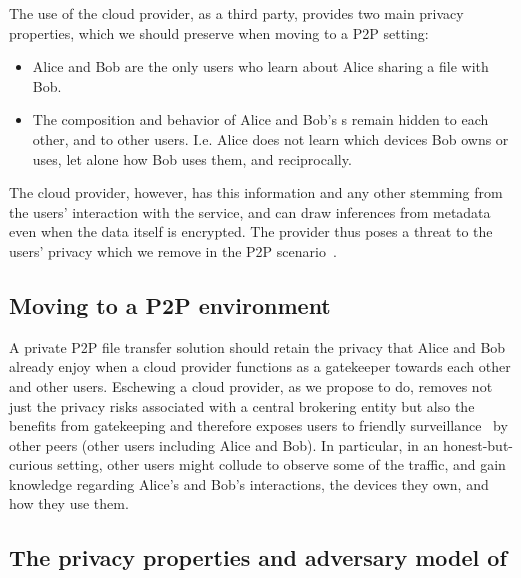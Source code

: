 The use of the cloud provider, as a third party,
provides two main privacy properties, which we should preserve when
moving to a P2P setting:
\begin{itemize}
\item Alice and Bob are the only users who learn 
about Alice sharing a file with Bob.
\item The composition and behavior of Alice and Bob's \squad{}s remain
  hidden to each other, and to other users. I.e. Alice does not learn
  which devices Bob owns or uses, let alone how Bob uses them, and
  reciprocally.
\end{itemize} 
The cloud provider, however, has this information and any other
stemming from the users' interaction with the service, and can draw
inferences from metadata even when the data itself is encrypted. The
provider thus poses a threat to the users' privacy which we remove in
the P2P scenario~\cite{DevilInMetadata}.


\subsection{Moving to a P2P environment}
A private P2P file transfer solution should retain the privacy that
Alice and Bob already enjoy when a cloud provider functions as a
gatekeeper towards each other and other users.  Eschewing a cloud
provider, as we propose to do, removes not just the privacy risks
associated with a central brokering entity but also the benefits from
gatekeeping and therefore exposes users to friendly
surveillance~\cite{FriendlySurveillance} by other peers (other \name
users including Alice and Bob). In particular, in an
honest-but-curious setting, other users might collude to observe some
of the traffic, and gain knowledge regarding Alice's and Bob's
interactions, the devices they own, and how they use them.

\subsection{The privacy properties and adversary model of \name}

